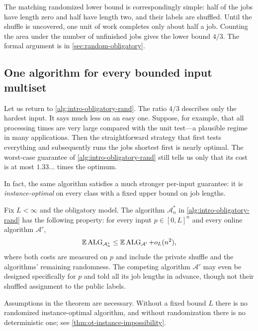 The matching randomized lower bound is correspondingly simple: half of the
jobs have length zero and half have length two, and their labels are shuffled.
Until the shuffle is uncovered, one unit of work completes only about half a
job.  Counting the area under the number of unfinished jobs gives the lower
bound $4/3$.  The formal argument is in \cref{sec:random-obligatory}.

\subsection{One algorithm for every bounded input multiset}
\label{sec:intro-obligatory-instance}

Let us return to \cref{alg:intro-obligatory-rand}.  The ratio $4/3$ describes
only the hardest input.  It says much less on an easy one.  Suppose, for
example, that all processing times are very large compared with the unit
test---a plausible regime in many applications.  Then the straightforward
strategy that first tests everything and subsequently runs the jobs shortest
first is nearly optimal.  The worst-case guarantee of
\cref{alg:intro-obligatory-rand} still tells us only that its cost is at most
$1.33\ldots$ times the optimum.

In fact, the same algorithm satisfies a much stronger per-input guarantee:
it is \emph{instance-optimal} on every class with a fixed upper bound on job
lengths.

\begin{theorem}
\label{thm:intro-obligatory-instance}
Fix $L<\infty$ and the obligatory model.  The algorithm $\mathcal A_n^*$ in
\cref{alg:intro-obligatory-rand} has the following property: for every
input $p\in[0,L]^n$ and every online algorithm $\mathcal A'$,
\[
 \mathbb{E}\operatorname{ALG}_{\mathcal A_n^*}\le \mathbb{E}\operatorname{ALG}_{\mathcal A'}+o_L(n^2),
\]
where both costs are measured on $p$ and include the private shuffle and the
algorithms' remaining randomness.
The competing algorithm $\mathcal A'$ may even be designed specifically for
$p$ and told all its job lengths in advance, though not their shuffled assignment
to the public labels.
\end{theorem}

Assumptions in the theorem are necessary.  Without a fixed bound $L$
there is no randomized instance-optimal algorithm, and without randomization
there is no deterministic one; see \cref{thm:ot-instance-impossibility}.

